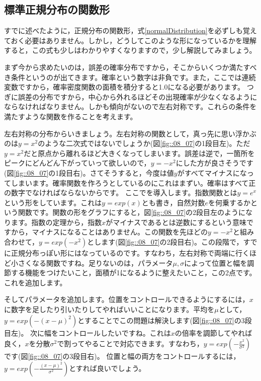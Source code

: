 \documentclass{ltjbook}
\begin{document}
\subsection{標準正規分布の関数形}
すでに述べたように，正規分布の関数形，式\ref{normalDistribution}を必ずしも覚えておく必要はありません。しかし，どうしてこのような形になっているかを理解すると，この式も少しはわかりやすくなりますので，少し解説してみましょう。

まず今から求めたいのは，誤差の確率分布ですから，そこからいくつか満たすべき条件というのが出てきます。確率という数字は非負です。また，ここでは連続変数ですから，確率密度関数の面積を積分すると1.0になる必要があります。
つぎに誤差の分布ですから，中心から外れるほどその出現確率が少なくなるようにならなければなりません。しかも傾向がないので左右対称です。これらの条件を満たすような関数を作ることを考えます。

左右対称の分布からいきましょう。左右対称の関数として，真っ先に思い浮かぶのは$y=x^2$のような二次式ではないでしょうか(図\ref{fig::08_07}の1段目左)。ただ$y=x^2$だと原点から離れるほど大きくなってしまいます。誤差は逆で，一箇所をピークにどんどん下がっていって欲しいので，$y=-x^2$にした方が良さそうです(図\ref{fig::08_07}の1段目右)。さてそうすると，今度は値$y$がすべてマイナスになってしまいます。確率関数を作ろうとしているのにこれはまずい。確率はすべて正の数字でなければならないからです。
ここでを導入します。指数関数とは$y=e^x$という形をしています。これは$y=exp(x)$とも書き，自然対数$e$を何乗するかという関数です\footnotemark。関数の形をグラフにすると，図\ref{fig::08_07}の2段目左のようになります。指数の定理から，指数$x$がマイナスであるとは逆数にするという意味ですから，マイナスになることはありません\footnotemark。この関数を先ほどの$y=-x^2$と組み合わせて，$y=exp(-x^2)$とします(図\ref{fig::08_07}の2段目右)。この段階で，すでに正規分布っぽい形にはなっているのです。すなわち，左右対称で両端に行くほど小さくなる関数ですね。足りないのは，パラメータ$\mu,\sigma$によって位置と幅を調節する機能をつけたいこと，面積が1になるように整えたいこと，この2点です。これを追加します。

そしてパラメータを追加します。位置をコントロールできるようにするには，$x$に数字を足したり引いたりしてやればいいことになります。平均を$\mu$として，$y=exp(-(x-\mu)^2)$とすることでこの問題は解決します(図\ref{fig::08_07}の3段目左)。
次に幅をコントロールしたいですね。これは$x$の倍率を調節してやれば良く，$x$を分散$\sigma^2$で割ってやることで対応できます。すなわち，$y=exp(-\frac{x^2}{\sigma^2})$です(図\ref{fig::08_07}の3段目右)。
位置と幅の両方をコントロールするには，$y=exp(-\frac{(x-\mu)^2}{\sigma^2})$とすれば良いでしょう。
\end{document}
